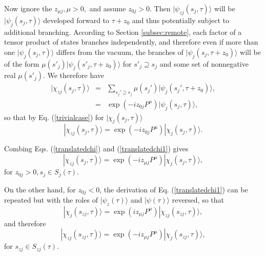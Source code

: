 \documentclass[twocolumn,amsmath,amssymb]{revtex4-1}
\begin{document}
Now ignore the $z_{\mu j}, \mu > 0, $ and assume $z_{0 j} > 0$.
Then $|\psi_{zj}( s_j, \tau) \rangle $
will be $|\psi_j( s_j, \tau) \rangle $ developed forward to $\tau + z_0$
and thus potentially subject to additional branching.
According to Section \ref{subsec:remote}, each factor of a tensor product of states
branches independently, and therefore even if more than one $|\psi_j( s_j, \tau) \rangle $
differs from the vacuum, 
the branches of
$|\psi_j( s_j, \tau + z_0) \rangle $
will be of the form
$\mu( s'_j) |\psi_j( s'_j, \tau + z_0) \rangle $ for $s'_j \supseteq s_j$
and some set of nonnegative real $\mu( s'_j)$.
We therefore have
\begin{subequations}
  \begin{eqnarray}
    \label{evolvedbranches}
    |\chi_{zj}( s_j, \tau) \rangle  & = &  \sum_{ s_j' \supseteq s_j} \mu( s_j') |\psi_j( s_j', \tau + z_0) \rangle , \\
    \label{evolvedbranches1}
    & = & \exp( -i z_{0 j} P^\mu) |\psi_j(s_j, \tau) \rangle ,
  \end{eqnarray}
\end{subequations}
so that by Eq. (\ref{trivialcase}) for $|\chi_j( s_j, \tau) \rangle $
\begin{equation}
  \label{translatedchi1}
   |\chi_{zj}( s_j, \tau) \rangle  = \exp( -i  z_{0 j} P^\mu) |\chi_j( s_j, \tau) \rangle .
\end{equation}






Combing Eqs. (\ref{translatedchi}) and (\ref{translatedchi1}) gives
\begin{equation}
  \label{translatedchi2}
   |\chi_{zj}( s_j, \tau) \rangle  = \exp( -i z_{\mu j} P^\mu) |\chi_j( s_j, \tau) \rangle ,
\end{equation}
for $z_{0j} > 0, s_j \in S_j( \tau)$. 

On the other hand, for $z_{0 j} < 0$, the derivation of Eq. (\ref{translatedchi1})
can be repeated but with the roles of $|\psi_z( \tau) \rangle $ and $|\psi( \tau) \rangle $ reversed,
so that
\begin{equation}
  \label{translatedchi3}
   |\chi_j( s_{zj}, \tau) \rangle  = \exp( i z_{\mu j} P^\mu) |\chi_{zj}( s_{zj}, \tau) \rangle ,
\end{equation}
and therefore
\begin{equation}
  \label{translatedchi4}
   |\chi_{zj}( s_{zj}, \tau) \rangle  = \exp( -i z_{\mu j} P^\mu) |\chi_j( s_{zj}, \tau) \rangle ,
\end{equation}
for $ s_{zj} \in S_{zj}( \tau)$.
\end{document}
